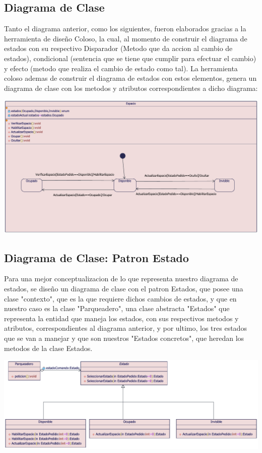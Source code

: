 \subsection{Diagrama de Clase}
\begin{flushleft}
Tanto el diagrama anterior, como los siguientes, fueron elaborados gracias a la herramienta de diseño Coloso, la cual, al momento de construir el diagrama de estados con su respectivo Disparador (Metodo que da accion al cambio de estados), condicional (sentencia que se tiene que cumplir para efectuar el cambio) y efecto (metodo que realiza el cambio de estado como tal). La herramienta coloso ademas de construir el diagrama de estados con estos elementos, genera un diagrama de clase con los metodos y atributos correspondientes a dicho diagrama:
\\
\begin{center}
{\includegraphics[width=1.18\linewidth]{imgs/Imagenes - Diagrama de estados/ClaseEstados1}}\end{center}
\end{flushleft}
\newpage
\subsection{Diagrama de Clase: Patron Estado}
\begin{flushleft}
Para una mejor conceptualizacion de lo que representa nuestro diagrama de estados, se diseño un diagrama de clase con el patron Estados, que posee una clase "contexto", que es la que requiere dichos cambios de estados, y que en nuestro caso es la clase "Parqueadero", una clase abstracta "Estados" que representa la entidad que maneja los estados, con sus respectivos metodos y atributos, correspondientes al diagrama anterior, y por ultimo, los tres estados que se van a manejar y que son nuestros "Estados concretos", que heredan los metodos de la clase Estados.
\begin{center}
	{\includegraphics[width=1.18\linewidth]{imgs/Imagenes - Diagrama de estados/ClaseEstados3}}\end{center}
\end{flushleft}

